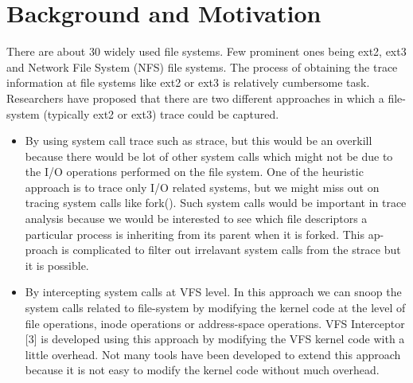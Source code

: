 \documentclass[conference]{IEEEtran}
\begin{document}

\section{Background and Motivation}
There are about 30 widely used file systems. Few prominent ones being ext2,
ext3 and Network File System (NFS) file systems. The process of obtaining
the trace information at file systems like ext2 or ext3 is relatively cumbersome
task. Researchers have proposed that there are two different approaches in
which a file-system (typically ext2 or ext3) trace could be captured.
\begin{itemize}
\item
By using system call trace such as strace, but this would be an overkill
because there would be lot of other system calls which might not be due
to the I/O operations performed on the file system. One of the heuristic
approach is to trace only I/O related systems, but we might miss out on
tracing system calls like fork(). Such system calls would be important in
trace analysis because we would be interested to see which file descriptors a
particular process is inheriting from its parent when it is forked. This ap-
proach is complicated to filter out irrelavant system calls from the strace but
it is possible.
\item
By intercepting system calls at VFS level. In this approach we can snoop
the system calls related to file-system by modifying the kernel code at the
level of file operations, inode operations or address-space operations. VFS
Interceptor [3] is developed using this approach by modifying the VFS kernel
code with a little overhead. Not many tools have been developed to extend
this approach because it is not easy to modify the kernel code without much
overhead.
\end{itemize}
\end{document}
